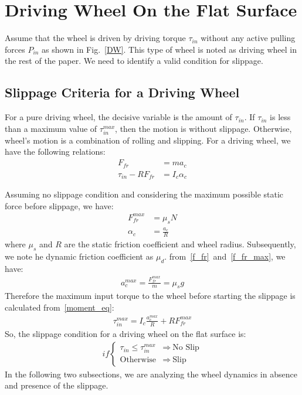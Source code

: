 \documentclass[letterpaper, 10pt, conference]{ieeeconf}
\begin{document}
\section{Driving Wheel On the Flat Surface} \label{DrivingWheel}

Assume that the wheel is driven by driving torque $\tau_{in}$ without any active pulling forces $P_{in}$ as shown in Fig.~\ref{DW}. This type of wheel is noted as driving wheel in the rest of the paper. We need to identify a valid condition for slippage. 

\subsection{Slippage Criteria for a Driving Wheel} \label{SlipCri-DW}

For a pure driving wheel, the decisive variable is the amount of $\tau_{in}$. If $\tau_{in}$ is less than a maximum value of $\tau_{in}^{max}$, then the motion is without slippage. Otherwise, wheel's motion is a combination of rolling and slipping. For a driving wheel, we have the following relations:
\begin{align}
F_{fr} &= ma_c \label{f_fr}\\
\tau_{in} - RF_{fr} &= I_c \alpha_c \label{moment_eq}
\end{align}

Assuming no slippage condition and considering the maximum possible static force before slippage, we have:
\begin{align}
F_{fr}^{max} &= \mu_{s} N \label{f_fr_max} \\
\alpha_c &= \frac{a_c}{R} \label{alpha_noSlip}
\end{align}
where $\mu_s$ and $R$ are the static friction coefficient and wheel radius. Subsequently, we note he dynamic friction coefficient as $\mu_d$. from~\eqref{f_fr}~and~\eqref{f_fr_max}, we have:
\begin{align}
a_c^{max} = \frac{F_{fr}^{max}}{m} = \mu_s g
\end{align}
Therefore the maximum input torque to the wheel before starting the slippage is calculated from~\eqref{moment_eq}:
\begin{align}
\tau_{in}^{max} = I_c \frac{a_c^{max}}{R} + R F_{fr}^{max} \label{tau_in_max}
\end{align}
So, the slippage condition for a driving wheel on the flat surface is:
\begin{align}
if \begin{cases}
\tau_{in} \leqslant \tau_{in}^{max} &\Rightarrow \ \text{No Slip} \\
\text{Otherwise} &\Rightarrow \ \text{Slip}
\end{cases} \label{slipCondition}
\end{align}
In the following two subsections, we are analyzing the wheel dynamics in absence and presence of the slippage.
\end{document}
